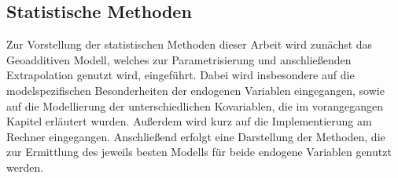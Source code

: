 \documentclass{Vorlage}
\begin{document}
\begin{table}[h]
\centering
\caption{Erhobene sozioökonomische und geographische Variablen der Gebäude- und Wohnungszählung im Rahmen des Zensus und deren Anzahl der Ausprägungen.}
\label{Var_Zensus}
\end{table}

\newpage

\subsection{Statistische Methoden}

Zur Vorstellung der statistischen Methoden dieser Arbeit wird zunächst das Geoadditiven Modell, welches zur Parametrisierung und anschließenden Extrapolation genutzt wird, eingeführt. Dabei wird insbesondere auf die modelspezifischen Besonderheiten der endogenen Variablen eingegangen, sowie auf die Modellierung der unterschiedlichen Kovariablen, die im vorangegangen Kapitel erläutert wurden. Außerdem wird kurz auf die Implementierung am Rechner eingegangen. Anschließend erfolgt eine Darstellung der Methoden, die zur Ermittlung des jeweils besten Modells für beide endogene Variablen genutzt werden.
\end{document}
